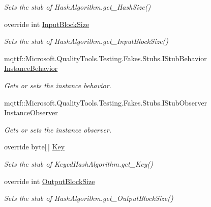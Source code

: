 \begin{DoxyCompactItemize}
\begin{DoxyCompactList}\small\item\em Sets the stub of Hash\-Algorithm.\-get\-\_\-\-Hash\-Size()\end{DoxyCompactList}\item 
override int \hyperlink{class_system_1_1_security_1_1_cryptography_1_1_fakes_1_1_stub_m_a_c_triple_d_e_s_a2b720e95214bfe7da124c2c7d188b668}{Input\-Block\-Size}
\begin{DoxyCompactList}\small\item\em Sets the stub of Hash\-Algorithm.\-get\-\_\-\-Input\-Block\-Size()\end{DoxyCompactList}\item 
mqttf\-::\-Microsoft.\-Quality\-Tools.\-Testing.\-Fakes.\-Stubs.\-I\-Stub\-Behavior \hyperlink{class_system_1_1_security_1_1_cryptography_1_1_fakes_1_1_stub_m_a_c_triple_d_e_s_a52a6f028fdd7454b065dcc2d803cd5ab}{Instance\-Behavior}
\begin{DoxyCompactList}\small\item\em Gets or sets the instance behavior.\end{DoxyCompactList}\item 
mqttf\-::\-Microsoft.\-Quality\-Tools.\-Testing.\-Fakes.\-Stubs.\-I\-Stub\-Observer \hyperlink{class_system_1_1_security_1_1_cryptography_1_1_fakes_1_1_stub_m_a_c_triple_d_e_s_a6bb2813610049152677be9bbe777375d}{Instance\-Observer}
\begin{DoxyCompactList}\small\item\em Gets or sets the instance observer.\end{DoxyCompactList}\item 
override byte\mbox{[}$\,$\mbox{]} \hyperlink{class_system_1_1_security_1_1_cryptography_1_1_fakes_1_1_stub_m_a_c_triple_d_e_s_a0f32d056a5ea106b731bbda67b5f2885}{Key}
\begin{DoxyCompactList}\small\item\em Sets the stub of Keyed\-Hash\-Algorithm.\-get\-\_\-\-Key()\end{DoxyCompactList}\item 
override int \hyperlink{class_system_1_1_security_1_1_cryptography_1_1_fakes_1_1_stub_m_a_c_triple_d_e_s_a31026d2b786e2d5581b7a845dcaa36cc}{Output\-Block\-Size}
\begin{DoxyCompactList}\small\item\em Sets the stub of Hash\-Algorithm.\-get\-\_\-\-Output\-Block\-Size()\end{DoxyCompactList}\end{DoxyCompactItemize}


